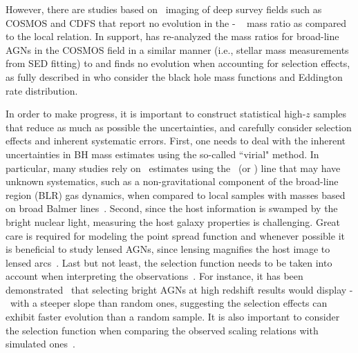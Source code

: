\documentclass[apj]{emulateapj}
\begin{document}
However, there are studies \citep{Cisternas2011,SS13,Mechtley2016} based on \hst\  imaging of deep survey fields such as COSMOS and CDFS that report no evolution in the \mbh - \smass ~ mass ratio as compared to the local relation. In support, \citet{Sun2015} has re-analyzed the mass ratios for broad-line AGNs in the COSMOS field in a similar manner (i.e., stellar mass measurements from SED fitting) to \citet{Merloni2010} and finds no evolution when accounting for selection effects, as fully described in \citet{Schulze2014} who consider the black hole mass functions and Eddington rate distribution. 

In order to make progress, it is important to construct statistical high-$z$ samples that reduce as much as possible the uncertainties, and carefully consider selection effects and inherent systematic errors. First, one needs to deal with the inherent uncertainties in BH mass estimates using the so-called ``virial" method. In particular, many studies rely on \mbh\ estimates using the \Civ\ (or \Mgii) line that may have unknown systematics, such as a non-gravitational component of the broad-line region (BLR) gas dynamics, when compared to local samples with masses based on broad Balmer lines~\citep[i.e., \halpha\ and \hbeta,][]{Schulze2018, Baskin2005, Trakhtenbrot2012}. Second, since the host information is swamped by the bright nuclear light, measuring the host galaxy properties is challenging. Great care is required for modeling the point spread function and whenever possible it is beneficial to study lensed AGNs, since lensing magnifies the host image to lensed arcs~\citep{Pen++06qsob, Ding2017a, Ding2017b}. Last but not least, the selection function needs to be taken into account when interpreting the observations~\citep{Treu2007, Lauer2007}. For instance, it has been demonstrated~\citep{Schulze2011, Schulze2014} that selecting bright AGNs at high redshift results would display \mbh - \smass\ with a steeper slope than random ones, suggesting the selection effects can exhibit faster evolution than a random sample. It is also important to consider the selection function when comparing the observed scaling relations with simulated ones~\citep{DeG++15}.

 
\end{document}
